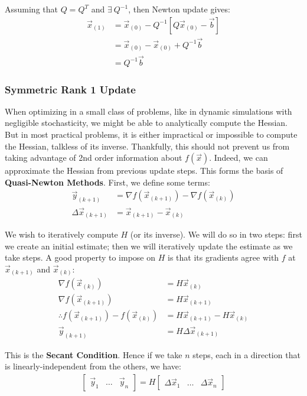 \documentclass[paper=a4, fontsize=12pt]{scrartcl} %
\numberwithin{equation}{section} %
\numberwithin{figure}{section} %
\numberwithin{table}{section} %
\begin{document}
Assuming that $Q = Q^T$ and $\exists \ Q^{-1}$, then Newton update gives:
\begin{align*}
    \vec{x}_{(1)} &= \vec{x}_{(0)} - Q^{-1} \left[ Q\vec{x}_{(0)} - \vec{b} \right] \\
    &= \vec{x}_{(0)} - \vec{x}_{(0)} + Q^{-1} \vec{b} \\
    &= Q^{-1} \vec{b}
\end{align*}

\subsubsection{Symmetric Rank 1 Update}

When optimizing in a small class of problems, like in dynamic simulations with negligible stochasticity, we might be able to analytically compute the Hessian. But in 
most practical problems, it is either impractical or impossible to compute the Hessian, talkless of its inverse. Thankfully, this should not prevent us from taking advantage of 2nd order 
information about $f(\vec{x})$. Indeed, we can approximate the Hessian from previous update steps. This forms the basis of \textbf{Quasi-Newton Methods}. First, we define some terms:
\begin{align*}
    \vec{y}_{(k+1)} &= \nabla f(\vec{x}_{(k+1)}) - \nabla f(\vec{x}_{(k)}) \\
    \Delta \vec{x}_{(k+1)} &= \vec{x}_{(k+1)} - \vec{x}_{(k)}
\end{align*}

We wish to iteratively compute $H$ (or its inverse). We will do so in two steps: first we create an initial estimate; then we will iteratively update the estimate as we take steps. 
A good property to impose on $H$ is that its gradients agree with $f$ at $\vec{x}_{(k+1)}$ and $\vec{x}_{(k)}$:
\begin{align*}
    \nabla f(\vec{x}_{(k)}) &= H \vec{x}_{(k)} \\
    \nabla f(\vec{x}_{(k + 1)}) &= H \vec{x}_{(k + 1)} \\
    \therefore f(\vec{x}_{(k + 1)}) - f(\vec{x}_{(k)}) &= H \vec{x}_{(k + 1)} - H \vec{x}_{(k)} \\
    \vec{y}_{(k+1)} &= H \Delta \vec{x}_{(k+1)}
\end{align*}

This is the \textbf{Secant Condition}. Hence if we take $n$ steps, each in a direction that is linearly-independent from the others, we have:
\begin{align*}
    \begin{bmatrix}
        \vec{y}_1 & \ldots & \vec{y}_n
    \end{bmatrix} = H \begin{bmatrix}
        \Delta \vec{x}_1 & \ldots & \Delta \vec{x}_n
    \end{bmatrix}
\end{align*}
\end{document}
